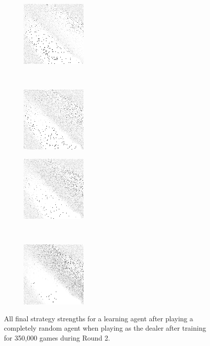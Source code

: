 \begin{figure}
	\begin{subfigure}[b]{0.4\textwidth}
		\includegraphics[height=0.23\textheight]{images/findings/round2/strats/random/crib_min_avg.png}
		\caption{\cribminavg}
	\end{subfigure}
	~
	\begin{subfigure}[b]{0.4\textwidth}
		\includegraphics[height=0.23\textheight]{images/findings/round2/strats/random/pegging_max_avg_gained.png}
		\caption{\peggingmaxavggained}
	\end{subfigure}

	\begin{subfigure}[b]{0.4\textwidth}
		\includegraphics[height=0.23\textheight]{images/findings/round2/strats/random/pegging_max_med_gained.png}
		\caption{\peggingmaxmedgained}
	\end{subfigure}
	~
	\begin{subfigure}[b]{0.4\textwidth}
		\includegraphics[height=0.23\textheight]{images/findings/round2/strats/random/pegging_min_avg_given.png}
		\caption{\peggingminavggiven}
	\end{subfigure}

\caption{
	All final strategy strengths for a learning agent
	after playing a completely random agent
	when playing as the dealer
	after training for 350,000 games during Round 2.
}
\label{fig:r2-strats-random}
\end{figure}

